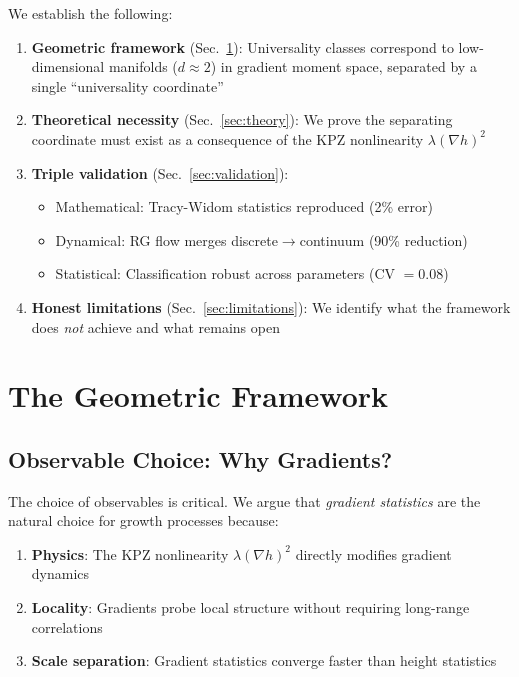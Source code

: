 \documentclass[aps,pre,twocolumn,superscriptaddress,showpacs,longbibliography]{revtex4-2}
\begin{document}
We establish the following:

\begin{enumerate}
\item \textbf{Geometric framework} (Sec.~\ref{sec:framework}): Universality classes correspond to low-dimensional manifolds ($d \approx 2$) in gradient moment space, separated by a single ``universality coordinate''

\item \textbf{Theoretical necessity} (Sec.~\ref{sec:theory}): We prove the separating coordinate must exist as a consequence of the KPZ nonlinearity $\lambda(\nabla h)^2$

\item \textbf{Triple validation} (Sec.~\ref{sec:validation}):
\begin{itemize}
\item Mathematical: Tracy-Widom statistics reproduced (2\% error)
\item Dynamical: RG flow merges discrete$\to$continuum (90\% reduction)
\item Statistical: Classification robust across parameters (CV $= 0.08$)
\end{itemize}

\item \textbf{Honest limitations} (Sec.~\ref{sec:limitations}): We identify what the framework does \emph{not} achieve and what remains open
\end{enumerate}

\section{The Geometric Framework}
\label{sec:framework}

\subsection{Observable Choice: Why Gradients?}

The choice of observables is critical. We argue that \emph{gradient statistics} are the natural choice for growth processes because:

\begin{enumerate}
\item \textbf{Physics}: The KPZ nonlinearity $\lambda(\nabla h)^2$ directly modifies gradient dynamics
\item \textbf{Locality}: Gradients probe local structure without requiring long-range correlations
\item \textbf{Scale separation}: Gradient statistics converge faster than height statistics
\end{enumerate}
\end{document}
